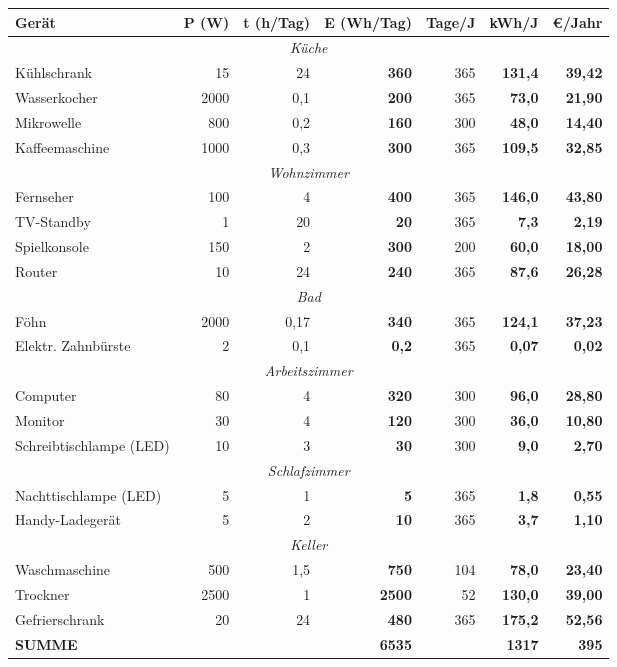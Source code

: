 \documentclass[11pt, a4paper]{article}
\newcommand{\lsg}[1]{\textcolor{loesung}{\textbf{#1}}}
\begin{document}
\begin{center}
\begin{tabular}{|l|r|r|r|r|r|r|}
\hline
\rowcolor{physik!20}
\textbf{Gerät} & \textbf{P (W)} & \textbf{t (h/Tag)} & \textbf{E (Wh/Tag)} & \textbf{Tage/J} & \textbf{kWh/J} & \textbf{€/Jahr} \\
\hline
\multicolumn{7}{|c|}{\cellcolor{physik!10}\textit{Küche}} \\
\hline
Kühlschrank & 15 & 24 & \lsg{360} & 365 & \lsg{131,4} & \lsg{39,42} \\
Wasserkocher & 2000 & 0,1 & \lsg{200} & 365 & \lsg{73,0} & \lsg{21,90} \\
Mikrowelle & 800 & 0,2 & \lsg{160} & 300 & \lsg{48,0} & \lsg{14,40} \\
Kaffeemaschine & 1000 & 0,3 & \lsg{300} & 365 & \lsg{109,5} & \lsg{32,85} \\
\hline
\multicolumn{7}{|c|}{\cellcolor{physik!10}\textit{Wohnzimmer}} \\
\hline
Fernseher & 100 & 4 & \lsg{400} & 365 & \lsg{146,0} & \lsg{43,80} \\
TV-Standby & 1 & 20 & \lsg{20} & 365 & \lsg{7,3} & \lsg{2,19} \\
Spielkonsole & 150 & 2 & \lsg{300} & 200 & \lsg{60,0} & \lsg{18,00} \\
Router & 10 & 24 & \lsg{240} & 365 & \lsg{87,6} & \lsg{26,28} \\
\hline
\multicolumn{7}{|c|}{\cellcolor{physik!10}\textit{Bad}} \\
\hline
Föhn & 2000 & 0,17 & \lsg{340} & 365 & \lsg{124,1} & \lsg{37,23} \\
Elektr. Zahnbürste & 2 & 0,1 & \lsg{0,2} & 365 & \lsg{0,07} & \lsg{0,02} \\
\hline
\multicolumn{7}{|c|}{\cellcolor{physik!10}\textit{Arbeitszimmer}} \\
\hline
Computer & 80 & 4 & \lsg{320} & 300 & \lsg{96,0} & \lsg{28,80} \\
Monitor & 30 & 4 & \lsg{120} & 300 & \lsg{36,0} & \lsg{10,80} \\
Schreibtischlampe (LED) & 10 & 3 & \lsg{30} & 300 & \lsg{9,0} & \lsg{2,70} \\
\hline
\multicolumn{7}{|c|}{\cellcolor{physik!10}\textit{Schlafzimmer}} \\
\hline
Nachttischlampe (LED) & 5 & 1 & \lsg{5} & 365 & \lsg{1,8} & \lsg{0,55} \\
Handy-Ladegerät & 5 & 2 & \lsg{10} & 365 & \lsg{3,7} & \lsg{1,10} \\
\hline
\multicolumn{7}{|c|}{\cellcolor{physik!10}\textit{Keller}} \\
\hline
Waschmaschine & 500 & 1,5 & \lsg{750} & 104 & \lsg{78,0} & \lsg{23,40} \\
Trockner & 2500 & 1 & \lsg{2500} & 52 & \lsg{130,0} & \lsg{39,00} \\
Gefrierschrank & 20 & 24 & \lsg{480} & 365 & \lsg{175,2} & \lsg{52,56} \\
\hline
\hline
\textbf{SUMME} & & & \lsg{6535} & & \lsg{1317} & \lsg{395} \\
\hline
\end{tabular}
\end{center}
\end{document}
